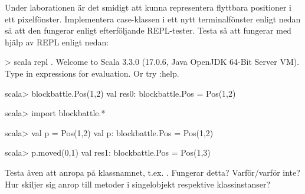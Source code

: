 \Subtask Under laborationen är det smidigt att kunna representera flyttbara positioner i ett pixelfönster. Implementera case-klassen  i ett nytt terminalfönster enligt nedan så att den fungerar enligt efterföljande REPL-tester.
Testa så att  fungerar med hjälp av REPL enligt nedan:
\begin{REPL}
> scala repl .
Welcome to Scala 3.3.0 (17.0.6, Java OpenJDK 64-Bit Server VM).
Type in expressions for evaluation. Or try :help.

scala> blockbattle.Pos(1,2)
val res0: blockbattle.Pos = Pos(1,2)

scala> import blockbattle.*

scala> val p = Pos(1,2)
val p: blockbattle.Pos = Pos(1,2)

scala> p.moved(0,1)
val res1: blockbattle.Pos = Pos(1,3)
\end{REPL}
Testa även att anropa  på klassnamnet, t.ex. . Fungerar detta? Varför/varför inte? Hur skiljer sig anrop till metoder i singelobjekt respektive klassinstanser?

